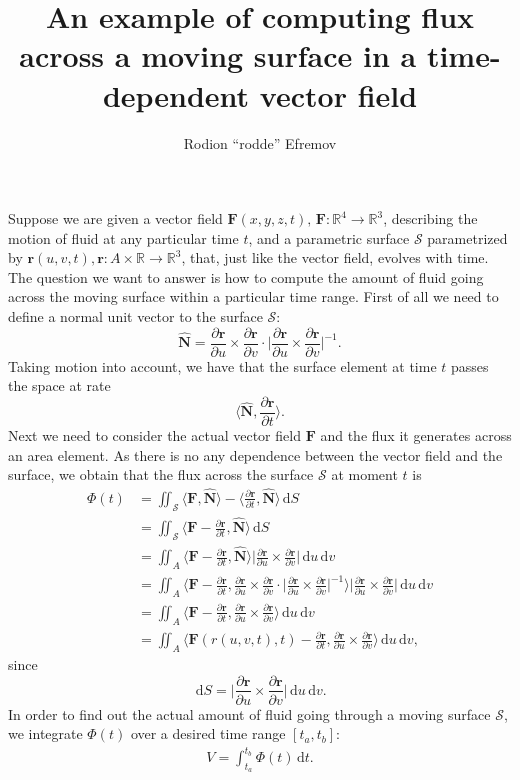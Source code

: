 \documentclass[12pt]{article}
\title{An example of computing flux across a moving surface in a time-dependent vector field}
\author{Rodion ``rodde'' Efremov}
\newcommand{\F}{\mathbf{F}}
\newcommand{\surf}{\mathbf{r}}
\newcommand{\N}{\hat{\mathbf{N}}}
\newcommand{\R}{\mathbb{R}}
\newcommand{\dr}{\partial \surf}
\newcommand{\du}{\partial u}
\newcommand{\dv}{\partial v}
\newcommand{\dt}{\partial t}
\newcommand{\dru}{\frac{\dr}{\du}}
\newcommand{\drv}{\frac{\dr}{\dv}}
\newcommand{\drt}{\frac{\dr}{\dt}}
\newcommand{\dS}{\,\mathrm{d}S}
\newcommand{\ddt}{\,\mathrm{d}t}
\newcommand{\ddu}{\, \mathrm{d}u}
\newcommand{\ddv}{\, \mathrm{d}v}
\begin{document}
 \maketitle

\noindent Suppose we are given a vector field $\F(x, y, z, t), \, \F \colon \R^4 \to \R^3$, describing the motion of fluid at any particular time $t$, and a parametric surface $\mathscr{S}$ parametrized by $\surf (u, v, t), \surf \colon A \times \R \to \R^3$, that, just like the vector field, evolves with time. The question we want to answer is how to compute the amount of fluid going across the moving surface within a particular time range. First of all we need to define a normal unit vector to the surface $\mathscr{S}$:
\[
\N = \dru \times \drv \cdot \Bigg| \dru \times \drv \Bigg|^{-1}.
\]
Taking motion into account, we have that the surface element at time $t$ passes the space at rate 
\[
\Big\langle \N , \drt \Big\rangle.
\]
Next we need to consider the actual vector field $\F$ and the flux it generates across an area element. As there is no any dependence between the vector field and the surface, we obtain that the flux across the surface $\mathscr{S}$ at moment $t$ is
\begin{align*}
\Phi(t) &= \iint_{\mathscr{S}} \langle \F, \N \rangle - \langle \drt, \N \rangle \dS \\
		   &= \iint_{\mathscr{S}} \langle \F - \drt, \N \rangle \dS \\
		   &= \iint_A \langle \F - \drt, \N \rangle \Bigg| \dru \times \drv \Bigg| \ddu \ddv \\ 
		   &= \iint_A \Bigg\langle \F - \drt, \dru \times \drv \cdot \Bigg| \dru \times \drv \Bigg|^{-1} \Bigg\rangle \Bigg| \dru \times \drv \Bigg| \ddu \ddv \\ 
		   &= \iint_A \Bigg\langle \F - \drt, \dru \times \drv \Bigg\rangle \ddu \ddv \\
		   &= \iint_A \Bigg\langle \F(r(u, v, t), t) - \drt, \dru \times \drv \Bigg\rangle \ddu \ddv,
\end{align*}
since
\[
\dS = \Bigg| \dru \times \drv \Bigg| \ddu \ddv.
\]
In order to find out the actual amount of fluid going through a moving surface $\mathscr{S}$, we integrate $\Phi(t)$ over a desired time range $\left[ t_a, t_b \right]$:
\begin{align*}
V = \int_{t_a}^{t_b} \Phi(t) \ddt.
\end{align*}
\end{document}
